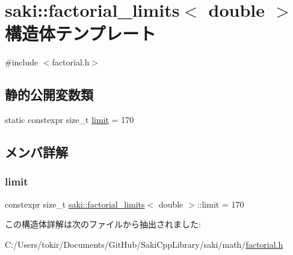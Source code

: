 \hypertarget{structsaki_1_1factorial__limits_3_01double_01_4}{}\section{saki\+:\+:factorial\+\_\+limits$<$ double $>$ 構造体テンプレート}
\label{structsaki_1_1factorial__limits_3_01double_01_4}


{\ttfamily \#include $<$factorial.\+h$>$}

\subsection*{静的公開変数類}
\begin{DoxyCompactItemize}
\item 
static constexpr size\+\_\+t \mbox{\hyperlink{structsaki_1_1factorial__limits_3_01double_01_4_af03e8d2f84c7a96e4685c2db93541b04}{limit}} = 170
\end{DoxyCompactItemize}


\subsection{メンバ詳解}
\mbox{\label{structsaki_1_1factorial__limits_3_01double_01_4_af03e8d2f84c7a96e4685c2db93541b04}} 
\subsubsection{\texorpdfstring{limit}{limit}}
{\footnotesize\ttfamily constexpr size\+\_\+t \mbox{\hyperlink{structsaki_1_1factorial__limits}{saki\+::factorial\+\_\+limits}}$<$ double $>$\+::limit = 170\hspace{0.3cm}{\ttfamily [static]}}



この構造体詳解は次のファイルから抽出されました\+:\begin{DoxyCompactItemize}
\item 
C\+:/\+Users/tokir/\+Documents/\+Git\+Hub/\+Saki\+Cpp\+Library/saki/math/\mbox{\hyperlink{factorial_8h}{factorial.\+h}}\end{DoxyCompactItemize}
